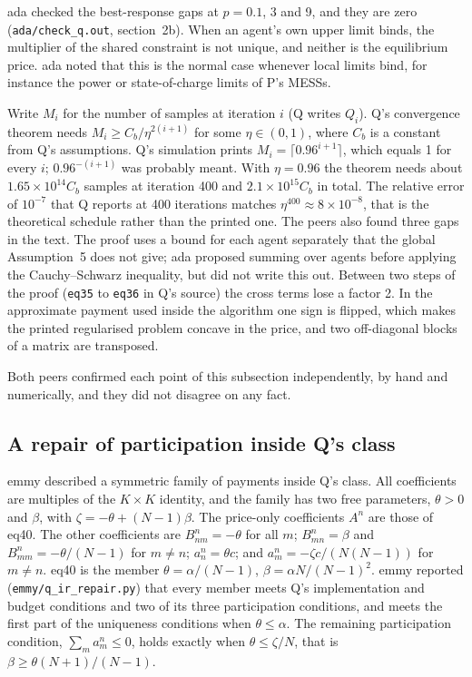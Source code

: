\documentclass{article}
\begin{document}
ada checked the best-response gaps at \(p=0.1\), 3 and 9, and they are zero (\texttt{ada/check\_q.out}, section~2b).
When an agent's own upper limit binds, the multiplier of the shared constraint is not unique, and neither is the equilibrium price.
ada noted that this is the normal case whenever local limits bind, for instance the power or state-of-charge limits of P's MESSs.

\begin{remark}\label{rem:algo}
Write \(M_i\) for the number of samples at iteration \(i\) (Q writes \(Q_i\)).
Q's convergence theorem needs \(M_i\ge C_b/\eta^{2(i+1)}\) for some \(\eta\in(0,1)\), where \(C_b\) is a constant from Q's assumptions.
Q's simulation prints \(M_i=\lceil0.96^{i+1}\rceil\), which equals 1 for every \(i\); \(0.96^{-(i+1)}\) was probably meant.
With \(\eta=0.96\) the theorem needs about \(1.65\times10^{14}C_b\) samples at iteration 400 and \(2.1\times10^{15}C_b\) in total.
The relative error of \(10^{-7}\) that Q reports at 400 iterations matches \(\eta^{400}\approx8\times10^{-8}\), that is the theoretical schedule rather than the printed one.
The peers also found three gaps in the text.
The proof uses a bound for each agent separately that the global Assumption~5 does not give; ada proposed summing over agents before applying the Cauchy--Schwarz inequality, but did not write this out.
Between two steps of the proof (\texttt{eq35} to \texttt{eq36} in Q's source) the cross terms lose a factor 2.
In the approximate payment used inside the algorithm one sign is flipped, which makes the printed regularised problem concave in the price, and two off-diagonal blocks of a matrix are transposed.
\end{remark}

Both peers confirmed each point of this subsection independently, by hand and numerically, and they did not disagree on any fact.

\subsection{A repair of participation inside Q's class}\label{sec:repair}

emmy described a symmetric family of payments inside Q's class.
All coefficients are multiples of the \(K\times K\) identity, and the family has two free parameters, \(\theta>0\) and \(\beta\), with \(\zeta=-\theta+(N-1)\beta\).
The price-only coefficients \(A^n\) are those of eq40.
The other coefficients are \(B^n_{nm}=-\theta\) for all \(m\); \(B^n_{mn}=\beta\) and \(B^n_{mm}=-\theta/(N-1)\) for \(m\ne n\); \(a^n_n=\theta c\); and \(a^n_m=-\zeta c/(N(N-1))\) for \(m\ne n\).
eq40 is the member \(\theta=\alpha/(N-1)\), \(\beta=\alpha N/(N-1)^2\).
emmy reported (\texttt{emmy/q\_ir\_repair.py}) that every member meets Q's implementation and budget conditions and two of its three participation conditions, and meets the first part of the uniqueness conditions when \(\theta\le\alpha\).
The remaining participation condition, \(\sum_ma^n_m\le0\), holds exactly when \(\theta\le\zeta/N\), that is \(\beta\ge\theta(N+1)/(N-1)\).
\end{document}
